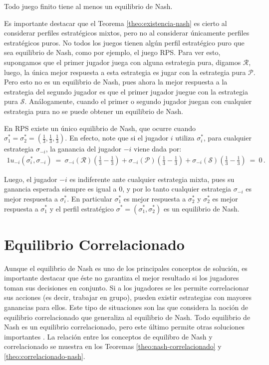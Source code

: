 \begin{theorem}
\label{theo:existencia-nash}
Todo juego finito tiene al menos un equilibrio de Nash.
\end{theorem}

Es importante destacar que el Teorema \ref{theo:existencia-nash} es cierto al considerar perfiles estratégicos mixtos, pero no al considerar únicamente perfiles estratégicos puros. No todos los juegos tienen algún perfil estratégico puro que sea equilibrio de Nash, como por ejemplo, el juego RPS. Para ver esto, supongamos que el primer jugador juega con alguna estrategia pura, digamos $\mathcal{R}$, luego, la única mejor respuesta a esta estrategia es jugar con la estrategia pura $\mathcal{P}$. Pero esto no es un equilibrio de Nash, pues ahora la mejor respuesta a la estrategia del segundo jugador es que el primer jugador juegue con la estrategia pura $\mathcal{S}$. Análogamente, cuando el primer o segundo jugador juegan con cualquier estrategia pura no se puede obtener un equilibrio de Nash.

En RPS existe un único equilibrio de Nash, que ocurre cuando $\sigma^*_1 = \sigma^*_2 = \left(\frac{1}{3}, \frac{1}{3}, \frac{1}{3} \right)$. En efecto, note que si el jugador $i$ utiliza $\sigma^*_i$, para cualquier estrategia $\sigma_{-i}$, la ganancia del jugador $-i$ viene dada por:
\begin{alignat}{1}
	u_{-i}(\sigma^*_i, \sigma_{-i})\ =\ \sigma_{-i}(\mathcal{R}) \left( \frac{1}{3} -  \frac{1}{3} \right) + \sigma_{-i}(\mathcal{P}) \left( \frac{1}{3} -  \frac{1}{3} \right) + \sigma_{-i}(\mathcal{S}) \left( \frac{1}{3} -  \frac{1}{3} \right)\ =\ 0 \,.
\end{alignat}

Luego, el jugador $-i$ es indiferente ante cualquier estrategia mixta, pues su ganancia esperada siempre es igual a $0$, y por lo tanto cualquier estrategia $\sigma_{-i}$ es mejor respuesta a $\sigma^*_i$. En particular $\sigma^*_1$ es mejor respuesta a $\sigma^*_2$ y $\sigma^*_2$ es mejor respuesta a $\sigma^*_1$ y el perfil estratégico $\sigma^* = (\sigma^*_1, \sigma^*_2)$ es un equilibrio de Nash.

\section{Equilibrio Correlacionado}
\label{section:equilibrio-correlacionado}

Aunque el equilibrio de Nash es uno de los principales conceptos de solución, es importante destacar que éste no garantiza el mejor resultado si los jugadores toman sus decisiones en conjunto. Si a los jugadores se les permite correlacionar sus acciones (es decir, trabajar en grupo), pueden existir estrategias con mayores ganancias para ellos. 
Este tipo de situaciones son las que considera la noción de equilibrio correlacionado que generaliza al equilibrio de Nash. Todo equilibrio de Nash es un equilibrio correlacionado, pero este último permite otras soluciones importantes \cite{bib:correlated-equilibrium}. La relación entre los conceptos de equilibro de Nash y correlacionado se muestra en los Teoremas \ref{theo:nash-correlacionado} y \ref{theo:correlacionado-nash}.

